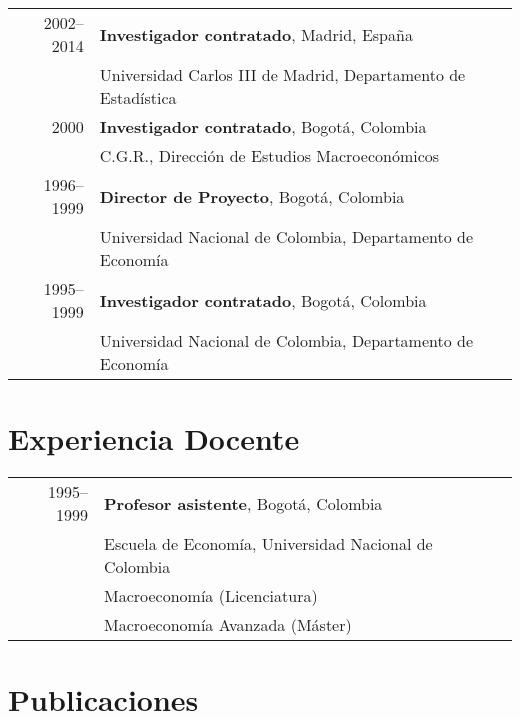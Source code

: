 \documentclass[11pt]{article}\usepackage[]{graphicx}\usepackage[]{color}
\begin{document}
\begin{tabular}{rl{-2cm}}

2002--2014 &  \textbf{Investigador contratado}, Madrid, España\\
& Universidad Carlos III de Madrid, Departamento de Estadística\\

2000 & \textbf{Investigador contratado}, Bogotá, Colombia\\
& C.G.R., Dirección de Estudios Macroeconómicos\\

1996--1999 & \textbf{Director de Proyecto}, Bogotá, Colombia\\
& Universidad Nacional de Colombia, Departamento de Economía\\

1995--1999 & \textbf{Investigador contratado}, Bogotá, Colombia\\
& Universidad Nacional de Colombia, Departamento de Economía}\\

\end{tabular}
\vspace{10pt}

\clearpage
\section{Experiencia Docente} 

\begin{tabular}{rl{-2cm}}
1995--1999 & \textbf{Profesor asistente}, Bogotá, Colombia\\
& Escuela de Economía, Universidad Nacional de Colombia\\
& Macroeconomía (Licenciatura)\\
& Macroeconomía Avanzada (Máster)\\
\end{tabular}
\vspace{10pt}

\section{Publicaciones}
\end{document}
